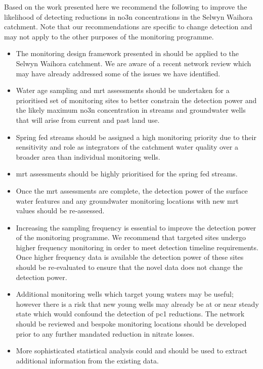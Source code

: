 Based on the work presented here we recommend the following to improve the likelihood of detecting reductions in \gls{no3n} concentrations in the Selwyn Waihora catchment.
Note that our recommendations are specific to change detection and may not apply to the other purposes of the monitoring programme.
\begin{itemize}
    \item The monitoring design framework presented in \citet{olw_guidance} should be applied to the Selwyn Waihora catchment. We are aware of a recent network review which may have already addressed some of the issues we have identified.
    \item Water age sampling and \gls{mrt} assessments should be undertaken for a prioritised set of monitoring sites to better constrain the detection power and the likely maximum \gls{no3n} concentration in streams and groundwater wells that will arise from current and past land use.
    \item Spring fed streams should be assigned a high monitoring priority due to their sensitivity and role as integrators of the catchment water quality over a broader area than individual monitoring wells.
    \item \gls{mrt} assessments should be highly prioritised for the spring fed streams.
    \item Once the \gls{mrt} assessments are complete, the detection power of the surface water features and any groundwater monitoring locations with new \gls{mrt} values should be re-assessed.
    \item Increasing the sampling frequency is essential to improve the detection power of the monitoring programme. We recommend that targeted sites undergo higher frequency monitoring in order to meet detection timeline requirements. Once higher frequency data is available the detection power of these sites should be re-evaluated to ensure that the novel data does not change the detection power.
    \item Additional monitoring wells which target young waters may be useful; however there is a risk that new young wells may already be at or near steady state which would confound the detection of \gls{pc1} reductions. The network should be reviewed and bespoke monitoring locations should be developed prior to any further mandated reduction in nitrate losses.
    \item More sophisticated statistical analysis could and should be used to extract additional information from the existing data.
\end{itemize}